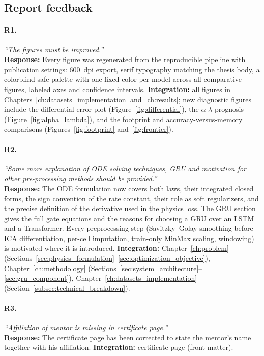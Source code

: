 \subsection*{Report feedback}

\paragraph{R1.} \emph{``The figures must be improved.''}\\
\textbf{Response:} Every figure was regenerated from the reproducible pipeline
with publication settings: 600~dpi export, serif typography matching the thesis
body, a colorblind-safe palette with one fixed color per model across all
comparative figures, labeled axes and confidence intervals.
\textbf{Integration:} all figures in Chapters~\ref{ch:datasets_implementation}
and~\ref{ch:results}; new diagnostic figures include the differential-error
plot (Figure~\ref{fig:differential}), the $\alpha$-$\lambda$ prognosis
(Figure~\ref{fig:alpha_lambda}), and the footprint and accuracy-versus-memory
comparisons (Figures~\ref{fig:footprint} and~\ref{fig:frontier}).

\paragraph{R2.} \emph{``Some more explanation of ODE solving techniques, GRU and
motivation for other pre-processing methods should be provided.''}\\
\textbf{Response:} The ODE formulation now covers both laws, their integrated
closed forms, the sign convention of the rate constant, their role as soft
regularizers, and the precise definition of the derivative used in the physics
loss. The GRU section gives the full gate equations and the reasons for
choosing a GRU over an LSTM and a Transformer. Every preprocessing step
(Savitzky--Golay smoothing before ICA differentiation, per-cell imputation,
train-only MinMax scaling, windowing) is motivated where it is introduced.
\textbf{Integration:} Chapter~\ref{ch:problem}
(Sections~\ref{sec:physics_formulation}--\ref{sec:optimization_objective}),
Chapter~\ref{ch:methodology}
(Sections~\ref{sec:system_architecture}--\ref{sec:gru_component}),
Chapter~\ref{ch:datasets_implementation}
(Section~\ref{subsec:technical_breakdown}).

\paragraph{R3.} \emph{``Affiliation of mentor is missing in certificate
page.''}\\
\textbf{Response:} The certificate page has been corrected to state the
mentor's name together with his affiliation.
\textbf{Integration:} certificate page (front matter).

